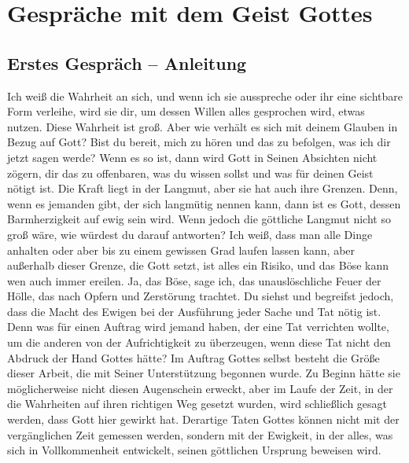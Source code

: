 \raggedbottom

\chapter{Gespräche mit dem Geist Gottes}


\section{Erstes Gespräch -- Anleitung}


Ich weiß die Wahrheit an sich, und wenn ich sie ausspreche oder ihr eine sichtbare Form verleihe, wird sie dir, um dessen Willen alles gesprochen wird, etwas nutzen. Diese Wahrheit ist groß. Aber wie verhält es sich mit deinem Glauben in Bezug auf Gott? Bist du bereit, mich zu hören und das zu befolgen, was ich dir jetzt sagen werde? Wenn es so ist, dann wird Gott in Seinen Absichten nicht zögern, dir das zu offenbaren, was du wissen sollst und was für deinen Geist nötigt ist. Die Kraft liegt in der Langmut, aber sie hat auch ihre Grenzen. Denn, wenn es jemanden gibt, der sich langmütig nennen kann, dann ist es Gott, dessen Barmherzigkeit auf ewig sein wird. Wenn jedoch die göttliche Langmut nicht so groß wäre, wie würdest du darauf antworten? Ich weiß, dass man alle Dinge anhalten oder aber bis zu einem gewissen Grad laufen lassen kann, aber außerhalb dieser Grenze, die Gott setzt, ist alles ein Risiko, und das Böse kann wen auch immer ereilen. Ja, das Böse, sage ich, das unauslöschliche Feuer der Hölle, das nach Opfern und Zerstörung trachtet. Du siehst und begreifst jedoch, dass die Macht des Ewigen bei der Ausführung jeder Sache und Tat nötig ist. Denn was für einen Auftrag wird jemand haben, der eine Tat verrichten wollte, um die anderen von der Aufrichtigkeit zu überzeugen, wenn diese Tat nicht den Abdruck der Hand Gottes hätte? Im Auftrag Gottes selbst besteht die Größe dieser Arbeit, die mit Seiner Unterstützung begonnen wurde. Zu Beginn hätte sie möglicherweise nicht diesen Augenschein erweckt, aber im Laufe der Zeit, in der die Wahrheiten auf ihren richtigen Weg gesetzt wurden, wird schließlich gesagt werden, dass Gott hier gewirkt hat. Derartige Taten Gottes können nicht mit der vergänglichen Zeit gemessen werden, sondern mit der Ewigkeit, in der alles, was sich in Vollkommenheit entwickelt, seinen göttlichen Ursprung beweisen wird.

